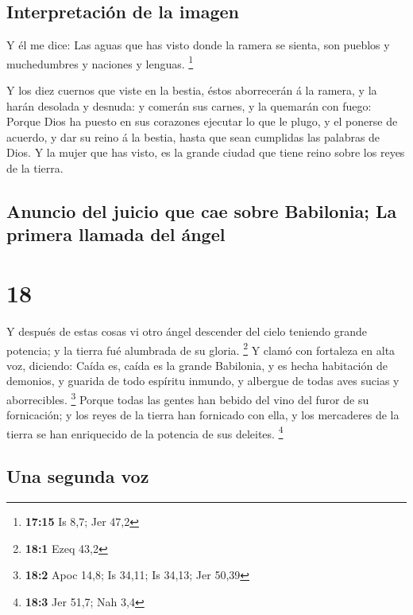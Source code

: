 \hypertarget{interpretaciuxf3n-de-la-imagen}{%
\subsection{Interpretación de la
imagen}\label{interpretaciuxf3n-de-la-imagen}}

 Y él me dice: Las aguas que has visto donde la ramera se
sienta, son pueblos y muchedumbres y naciones y lenguas. \footnote{\textbf{17:15}
  Is 8,7; Jer 47,2}

 Y los diez cuernos que viste en la bestia, éstos
aborrecerán á la ramera, y la harán desolada y desnuda: y comerán sus
carnes, y la quemarán con fuego:  Porque Dios ha puesto en
sus corazones ejecutar lo que le plugo, y el ponerse de acuerdo, y dar
su reino á la bestia, hasta que sean cumplidas las palabras de Dios.
 Y la mujer que has visto, es la grande ciudad que tiene
reino sobre los reyes de la tierra.

\hypertarget{anuncio-del-juicio-que-cae-sobre-babilonia-la-primera-llamada-del-uxe1ngel}{%
\subsection{Anuncio del juicio que cae sobre Babilonia; La primera
llamada del
ángel}\label{anuncio-del-juicio-que-cae-sobre-babilonia-la-primera-llamada-del-uxe1ngel}}

\hypertarget{section-17}{%
\section{18}\label{section-17}}

 Y después de estas cosas vi otro ángel descender del cielo
teniendo grande potencia; y la tierra fué alumbrada de su gloria.
\footnote{\textbf{18:1} Ezeq 43,2}  Y clamó con fortaleza en
alta voz, diciendo: Caída es, caída es la grande Babilonia, y es hecha
habitación de demonios, y guarida de todo espíritu inmundo, y albergue
de todas aves sucias y aborrecibles. \footnote{\textbf{18:2} Apoc 14,8;
  Is 34,11; Is 34,13; Jer 50,39}  Porque todas las gentes
han bebido del vino del furor de su fornicación; y los reyes de la
tierra han fornicado con ella, y los mercaderes de la tierra se han
enriquecido de la potencia de sus deleites. \footnote{\textbf{18:3} Jer
  51,7; Nah 3,4}

\hypertarget{una-segunda-voz}{%
\subsection{Una segunda voz}\label{una-segunda-voz}}

